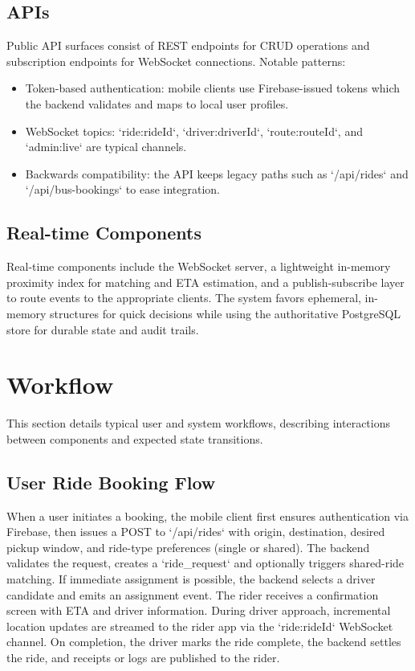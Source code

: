 \documentclass[12pt,a4paper]{article}
\begin{document}
\subsection{APIs}
Public API surfaces consist of REST endpoints for CRUD operations and subscription endpoints for WebSocket connections. Notable patterns:
\begin{itemize}
  \item Token-based authentication: mobile clients use Firebase-issued tokens which the backend validates and maps to local user profiles.
  \item WebSocket topics: `ride:{rideId}`, `driver:{driverId}`, `route:{routeId}`, and `admin:live` are typical channels.
  \item Backwards compatibility: the API keeps legacy paths such as `/api/rides` and `/api/bus-bookings` to ease integration.
\end{itemize}

\subsection{Real-time Components}
Real-time components include the WebSocket server, a lightweight in-memory proximity index for matching and ETA estimation, and a publish-subscribe layer to route events to the appropriate clients. The system favors ephemeral, in-memory structures for quick decisions while using the authoritative PostgreSQL store for durable state and audit trails.

\section{Workflow}
This section details typical user and system workflows, describing interactions between components and expected state transitions.

\subsection{User Ride Booking Flow}
When a user initiates a booking, the mobile client first ensures authentication via Firebase, then issues a POST to `/api/rides` with origin, destination, desired pickup window, and ride-type preferences (single or shared). The backend validates the request, creates a `ride_request` and optionally triggers shared-ride matching. If immediate assignment is possible, the backend selects a driver candidate and emits an assignment event. The rider receives a confirmation screen with ETA and driver information. During driver approach, incremental location updates are streamed to the rider app via the `ride:{rideId}` WebSocket channel. On completion, the driver marks the ride complete, the backend settles the ride, and receipts or logs are published to the rider.
\end{document}
